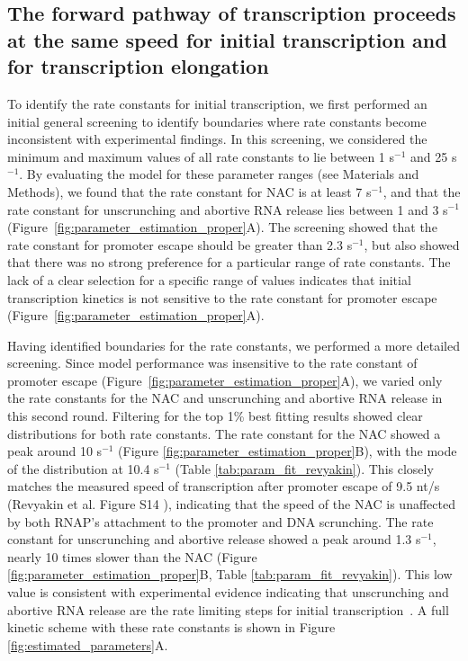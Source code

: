 %
\subsection{The forward pathway of transcription proceeds at the same speed
for initial transcription and for transcription elongation}

To identify the rate constants for initial transcription, we first performed
an initial general screening to identify boundaries where rate constants
become inconsistent with experimental findings. In this screening, we
considered the minimum and maximum values of all rate constants to lie between
1 s$^{-1}$ and 25 s$^{-1}$. By evaluating the model for these parameter ranges
(see Materials and Methods), we found that the rate constant for NAC is at
least 7 s$^{-1}$, and that the rate constant for unscrunching and abortive RNA
release lies between 1 and 3 s$^{-1}$
(Figure~\ref{fig:parameter_estimation_proper}A). The screening showed that the
rate constant for promoter escape should be greater than 2.3 s$^{-1}$, but
also showed that there was no strong preference for a particular range of rate
constants. The lack of a clear selection for a specific range of values
indicates that initial transcription kinetics is not sensitive to the rate
constant for promoter escape (Figure~\ref{fig:parameter_estimation_proper}A).

Having identified boundaries for the rate constants, we performed a more
detailed screening. Since model performance was insensitive to the rate
constant of promoter escape (Figure~\ref{fig:parameter_estimation_proper}A),
we varied only the rate constants for the NAC and unscrunching and abortive
RNA release in this second round. Filtering for the top 1\% best fitting
results showed clear distributions for both rate constants. The
rate constant for the NAC showed a peak around 10 s$^{-1}$ (Figure
\ref{fig:parameter_estimation_proper}B), with the mode of the distribution at
10.4 s$^{-1}$ (Table \ref{tab:param_fit_revyakin}). This closely matches the
measured speed of transcription after promoter escape of 9.5 nt/s (Revyakin et
al. Figure S14 \cite{revyakin_abortive_2006}), indicating that the speed of
the NAC is unaffected by both RNAP's attachment to the promoter and DNA
scrunching. The rate constant for unscrunching and abortive release showed a
peak around 1.3 s$^{-1}$, nearly 10 times slower than the NAC (Figure
\ref{fig:parameter_estimation_proper}B, Table \ref{tab:param_fit_revyakin}).
This low value is consistent with experimental evidence indicating that
unscrunching and abortive RNA release are the rate limiting steps for initial
transcription~\cite{margeat_direct_2006, revyakin_abortive_2006}. A full
kinetic scheme with these rate constants is shown in Figure
\ref{fig:estimated_parameters}A.

